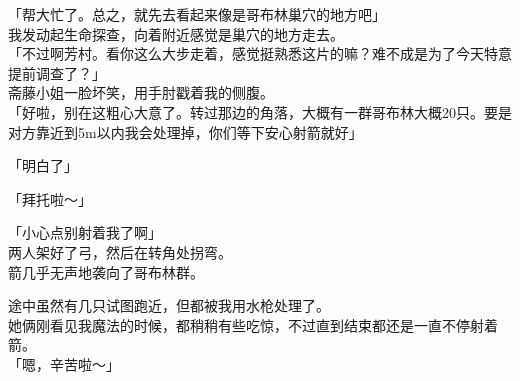 「帮大忙了。总之，就先去看起来像是哥布林巢穴的地方吧」\\

我发动起生命探查，向着附近感觉是巢穴的地方走去。\\

「不过啊芳村。看你这么大步走着，感觉挺熟悉这片的嘛？难不成是为了今天特意提前调查了？」\\

斋藤小姐一脸坏笑，用手肘戳着我的侧腹。\\

「好啦，别在这粗心大意了。转过那边的角落，大概有一群哥布林大概20只。要是对方靠近到5m以内我会处理掉，你们等下安心射箭就好」

「明白了」

「拜托啦～」

「小心点别射着我了啊」\\

两人架好了弓，然后在转角处拐弯。\\

箭几乎无声地袭向了哥布林群。

途中虽然有几只试图跑近，但都被我用水枪处理了。\\

她俩刚看见我魔法的时候，都稍稍有些吃惊，不过直到结束都还是一直不停射着箭。\\

「嗯，辛苦啦～」\\

